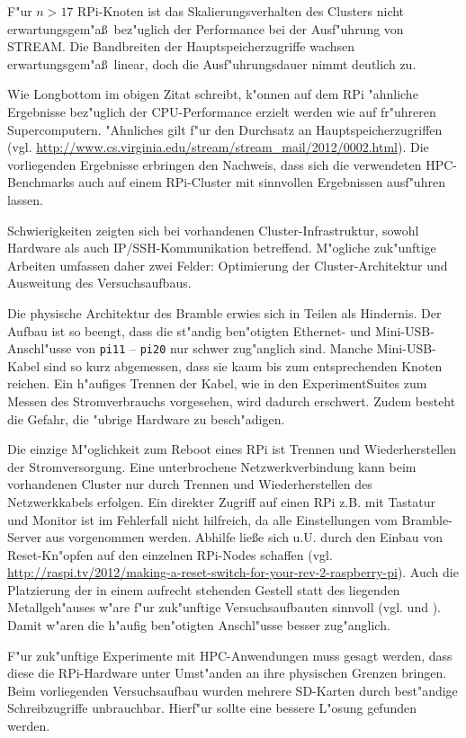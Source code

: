 F"ur $n>17$ RPi-Knoten ist das Skalierungsverhalten des Clusters nicht erwartungsgem"a\ss\ bez"uglich der Performance bei der Ausf"uhrung von STREAM. Die Bandbreiten der Hauptspeicherzugriffe wachsen erwartungsgem"a\ss\ linear, doch die Ausf"uhrungsdauer nimmt deutlich zu. 

\noindent
Wie Longbottom im obigen Zitat schreibt, k"onnen auf dem RPi "ahnliche Ergebnisse bez"uglich der CPU-Performance erzielt werden wie auf fr"uhreren Supercomputern. "Ahnliches gilt f"ur den Durchsatz an Hauptspeicherzugriffen (vgl. \url{http://www.cs.virginia.edu/stream/stream_mail/2012/0002.html}). Die vorliegenden Ergebnisse erbringen den Nachweis, dass sich die verwendeten HPC-Benchmarks auch auf einem RPi-Cluster mit sinnvollen Ergebnissen ausf"uhren lassen. 

Schwierigkeiten zeigten sich bei vorhandenen Cluster-Infrastruktur, sowohl Hardware als auch IP/SSH-Kommunikation betreffend. M"ogliche zuk"unftige Arbeiten umfassen daher zwei Felder: Optimierung der Cluster-Architektur und Ausweitung des Versuchsaufbaus.

Die physische Architektur des Bramble erwies sich in Teilen als Hindernis. Der Aufbau ist so beengt, dass die st"andig ben"otigten Ethernet- und Mini-USB-Anschl"usse von \texttt{pi11} -- \texttt{pi20} nur schwer zug"anglich sind. Manche Mini-USB-Kabel sind so kurz abgemessen, dass sie kaum bis zum entsprechenden Knoten reichen. Ein h"aufiges Trennen der Kabel, wie in den ExperimentSuites zum Messen des Stromverbrauchs vorgesehen, wird dadurch erschwert. Zudem besteht die Gefahr, die "ubrige Hardware zu besch"adigen. 

Die einzige M"oglichkeit zum Reboot eines RPi ist Trennen und Wiederherstellen der Stromversorgung. Eine unterbrochene Netzwerkverbindung kann beim vorhandenen Cluster nur durch Trennen und Wiederherstellen des Netzwerkkabels erfolgen. Ein direkter Zugriff auf einen RPi z.B. mit Tastatur und Monitor ist im Fehlerfall nicht hilfreich, da alle Einstellungen vom Bramble-Server aus vorgenommen werden. Abhilfe lie\ss e sich u.U. durch den Einbau von Reset-Kn"opfen auf den einzelnen RPi-Nodes schaffen (vgl. \url{http://raspi.tv/2012/making-a-reset-switch-for-your-rev-2-raspberry-pi}). Auch die Platzierung der in einem aufrecht stehenden Gestell statt des liegenden Metallgeh"auses w"are f"ur zuk"unftige Versuchsaufbauten sinnvoll (vgl. \cite{kie01} und \cite{cox13}). Damit w"aren die h"aufig ben"otigten Anschl"usse besser zug"anglich. 

F"ur zuk"unftige Experimente mit HPC-Anwendungen muss gesagt werden, dass diese die RPi-Hardware unter Umst"anden an ihre physischen Grenzen bringen. Beim vorliegenden Versuchsaufbau wurden mehrere SD-Karten durch best"andige Schreibzugriffe unbrauchbar. Hierf"ur sollte eine bessere L"osung gefunden werden. 

